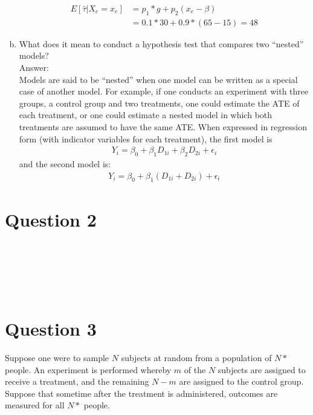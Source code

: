 \documentclass[11pt,notitlepage]{article}\usepackage[]{graphicx}\usepackage[]{color}
\makeatletter
\newenvironment{kframe}{%
 \def\at@end@of@kframe{}%
 \ifinner\ifhmode%
  \def\at@end@of@kframe{\end{minipage}}%
  \begin{minipage}{\columnwidth}%
 \fi\fi%
 \def\FrameCommand##1{\hskip\@totalleftmargin \hskip-\fboxsep
 \colorbox{shadecolor}{##1}\hskip-\fboxsep
     \hskip-\linewidth \hskip-\@totalleftmargin \hskip\columnwidth}%
 \MakeFramed {\advance\hsize-\width
   \@totalleftmargin\z@ \linewidth\hsize
   \@setminipage}}%
 {\par\unskip\endMakeFramed%
 \at@end@of@kframe}
\newenvironment{knitrout}{}{} %
\makeatother
\begin{document}
\begin{enumerate}[a)]
\begin{align*}
E[\bar{\tau}|X_e = x_e] &= p_1*g + p_2(x_e - \beta) \\
&= 0.1 * 30 + 0.9*(65-15) = 48
\end{align*}


\item  What does it mean to conduct a hypothesis test that compares two ``nested'' models?\\
Answer:\\
Models are said to be ``nested'' when one model can be written as a special case of another model. For example, if one conducts an experiment with three groups, a control group and two treatments, one could estimate the ATE of each treatment, or one could estimate a nested model in which both treatments are assumed to have the same ATE.  When expressed in regression form (with indicator variables for each treatment), the first model is 
\begin{align*}
Y_i = \beta_0 + \beta_1 D_{1i} + \beta_2 D_{2i} + \epsilon_i
\end{align*}
and the second model is:
\begin{align*}
Y_i = \beta_0 + \beta_1 (D_{1i} + D_{2i}) + \epsilon_i
\end{align*}

\end{enumerate}


\section*{Question 2}
\begin{knitrout}
\color{fgcolor}\begin{kframe}
\begin{verbatim}






\end{verbatim}
\end{kframe}
\end{knitrout}


\section*{Question 3}
Suppose one were to sample $N$ subjects at random from a population of $N*$ people. An experiment is performed whereby $m$ of the $N$ subjects are assigned to receive a treatment, and the remaining $N - m$ are assigned to the control group. Suppose that sometime after the treatment is administered, outcomes are measured for all $N*$ people.
\end{document}
